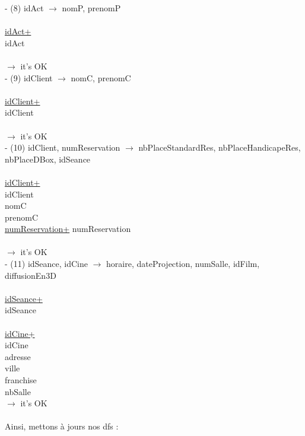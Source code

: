 \documentclass[a4paper,sffamily,12pt]{article}
\begin{document}
						\noindent - (8) idAct $\rightarrow$ nomP, prenomP \\
							\\
							\underline{idAct+} \\
							idAct \\	
							\\									
						$\rightarrow$ it's OK \\	

						\noindent - (9) idClient $\rightarrow$ nomC, prenomC \\
							\\
							\underline{idClient+} \\
							idClient \\	
							\\									
						$\rightarrow$ it's OK \\		

						\noindent - (10) idClient, numReservation $\rightarrow$ nbPlaceStandardRes, nbPlaceHandicapeRes, nbPlaceDBox, idSeance \\
							\\
							\underline{idClient+} \\
							idClient \\
							nomC \\
							prenomC \\
							\underline{numReservation+}
							numReservation \\	
							\\									
						$\rightarrow$ it's OK \\		

						\noindent - (11) idSeance, idCine $\rightarrow$ horaire, dateProjection, numSalle, idFilm, diffusionEn3D \\
							\\
							\underline{idSeance+} \\
							idSeance \\
							\\		
							\underline{idCine+}\\
							idCine \\
							adresse \\
							ville \\
							franchise \\
							nbSalle \\							
						$\rightarrow$ it's OK \\							
						\\		
						Ainsi, mettons à jours nos dfs : \\																
						
\end{document}
